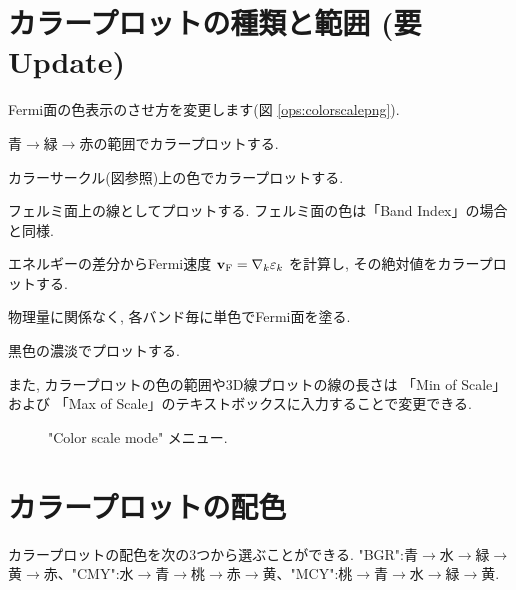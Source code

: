 \documentclass[letterpaper,10pt,dvipdfmx,openany]{sphinxmanual}
\let\sphinxpxdimen\pdfpxdimen\else\newdimen\sphinxpxdimen
\begin{document}
\section{カラープロットの種類と範囲 (要Update)}
\label{\detokenize{ops:update}}
\sphinxAtStartPar
Fermi面の色表示のさせ方を変更します(図 \ref{ops:colorscalepng}).
\begin{description}
\sphinxAtStartPar
青\(\rightarrow\)緑\(\rightarrow\)赤の範囲でカラープロットする.

\sphinxAtStartPar
カラーサークル(図参照)上の色でカラープロットする.

\sphinxAtStartPar
フェルミ面上の線としてプロットする.
フェルミ面の色は「Band Index」の場合と同様.

\sphinxAtStartPar
エネルギーの差分からFermi速度 \({\bf v}_{\rm F} = \nabla_k \varepsilon_k\)
を計算し, その絶対値をカラープロットする.

\sphinxAtStartPar
物理量に関係なく, 各バンド毎に単色でFermi面を塗る.

\sphinxAtStartPar
黒色の濃淡でプロットする.

\end{description}

\sphinxAtStartPar
また, カラープロットの色の範囲や3D線プロットの線の長さは
「Min of Scale」および 「Max of Scale」のテキストボックスに入力することで変更できる.

\begin{figure}[htbp]
\centering
\capstart

\noindent\sphinxincludegraphics[width=700\sphinxpxdimen]{{colorscale}.png}
\caption{"Color scale mode" メニュー.}\label{\detokenize{ops:id19}}\label{\detokenize{ops:colorscalepng}}\end{figure}


\section{カラープロットの配色}
\label{\detokenize{ops:id5}}
\sphinxAtStartPar
カラープロットの配色を次の3つから選ぶことができる.
"BGR":青\(\rightarrow\)水\(\rightarrow\)緑\(\rightarrow\)黄\(\rightarrow\)赤、"CMY":水\(\rightarrow\)青\(\rightarrow\)桃\(\rightarrow\)赤\(\rightarrow\)黄、"MCY":桃\(\rightarrow\)青\(\rightarrow\)水\(\rightarrow\)緑\(\rightarrow\)黄.
\end{document}
